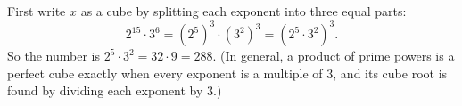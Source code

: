 First write $x$ as a cube by splitting each exponent into three equal parts:
\[
2^{15}\cdot3^6=\left(2^5\right)^3\cdot\left(3^2\right)^3=\left(2^5\cdot3^2\right)^3 .
\]
So the number is $2^5\cdot3^2=32\cdot9=\boxed{288}$. (In general, a product of prime powers is a perfect cube exactly when every exponent is a multiple of $3$, and its cube root is found by dividing each exponent by $3$.)
